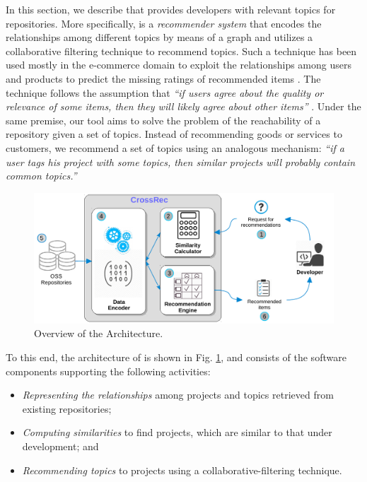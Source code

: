 In this section, we describe \CT that provides developers with relevant topics for \GH repositories. More specifically, \CT is a \emph{recommender system} \cite{Aggarwal2016} that encodes the relationships among different topics by means of a graph and utilizes a collaborative filtering technique \cite{Schafer:2007:CFR:1768197.1768208} to recommend \GH topics. Such a technique has been used mostly in the e-commerce domain to exploit the relationships among users and products to predict the missing ratings of recommended items \cite{Linden:2003:ARI:642462.642471}. The technique follows the assumption that \emph{``if users agree about the quality or relevance of some items, then they will likely agree about other items''} \cite{Schafer:2007:CFR:1768197.1768208}. Under the same premise, our tool aims to solve the problem of the reachability of a \GH repository given a set of topics. Instead of recommending goods or services to customers, we recommend a set of topics using an analogous mechanism: \emph{``if a user tags his project with some topics, then similar projects will probably contain common topics.''} 

\begin{figure}[t!]
	\centering
	\includegraphics[width=\linewidth]{figs/CrossRec.pdf}
	\caption{Overview of the \CT Architecture.}%
	\label{fig:CrossRecArchitecture}
\end{figure}

%
To this end, the architecture of \CT is shown in Fig. \ref{fig:CrossRecArchitecture}, and consists of the software components supporting the following activities:

\begin{itemize}
\item \textit{Representing the relationships} among projects and topics retrieved from existing repositories;
\item \textit{Computing similarities} to find projects, which are similar to that under development; and
\item \textit{Recommending topics} to projects using a collaborative-filtering technique.
\end{itemize}


